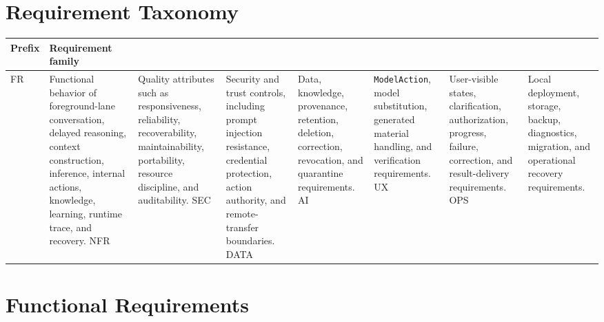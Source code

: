 \documentclass[11pt]{report}
\begin{document}

\section{Requirement Taxonomy}

\begin{tabularx}{.95\linewidth}{@{}lX@{}}
	\toprule
	\textbf{Prefix} & \textbf{Requirement family} \\
	\midrule
	FR & Functional behavior of foreground-lane conversation, delayed reasoning, context construction, inference, internal actions, knowledge, learning, runtime trace, and recovery. \N
	NFR & Quality attributes such as responsiveness, reliability, recoverability, maintainability, portability, resource discipline, and auditability. \N
	SEC & Security and trust controls, including prompt injection resistance, credential protection, action authority, and remote-transfer boundaries. \N
	DATA & Data, knowledge, provenance, retention, deletion, correction, revocation, and quarantine requirements. \N
	AI & \texttt{ModelAction}, model substitution, generated material handling, and verification requirements. \N
	UX & User-visible states, clarification, authorization, progress, failure, correction, and result-delivery requirements. \N
	OPS & Local deployment, storage, backup, diagnostics, migration, and operational recovery requirements. \\
	\bottomrule
\end{tabularx}
\newpage

\section{Functional Requirements}
\end{document}
